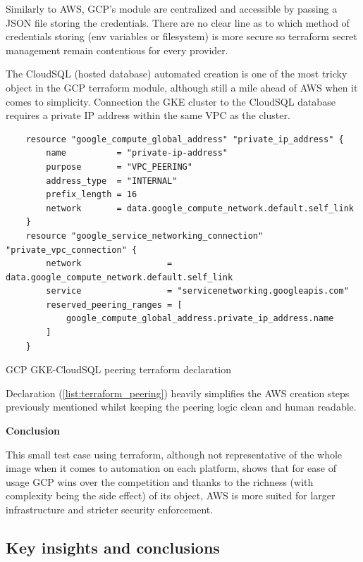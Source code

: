 \documentclass[11pt]{article}
\begin{document}
Similarly to AWS, GCP's module are centralized and accessible by passing a JSON file storing the credentials. There are no clear line as to which method of credentials storing (env variables or filesystem) is more secure so terraform secret management remain contentious for every provider. 

The CloudSQL (hosted database) automated creation is one of the most tricky object in the GCP terraform module, although still a mile ahead of AWS when it comes to simplicity. Connection the GKE cluster to the CloudSQL database requires a private IP address within the same VPC as the cluster.

\begin{listing}[H]
    \begin{verbatim}
    resource "google_compute_global_address" "private_ip_address" {
        name          = "private-ip-address"
        purpose       = "VPC_PEERING"
        address_type  = "INTERNAL"
        prefix_length = 16
        network       = data.google_compute_network.default.self_link
    }
    resource "google_service_networking_connection" "private_vpc_connection" {
        network                 = data.google_compute_network.default.self_link
        service                 = "servicenetworking.googleapis.com"
        reserved_peering_ranges = [
            google_compute_global_address.private_ip_address.name
        ]
    }
    \end{verbatim}
    \caption{GCP GKE-CloudSQL peering terraform declaration}
    \label{list:terraform_peering}
\end{listing}

Declaration (\ref{list:terraform_peering}) heavily simplifies the AWS creation steps previously mentioned whilst keeping the peering logic clean and human readable.

\vspace{3mm}
\textbf{Conclusion}

This small test case using terraform, although not representative of the whole image when it comes to automation on each platform, shows that for ease of usage GCP wins over the competition and thanks to the richness (with complexity being the side effect) of its object, AWS is more suited for larger infrastructure and stricter security enforcement. 

\subsection{Key insights and conclusions}
\end{document}
